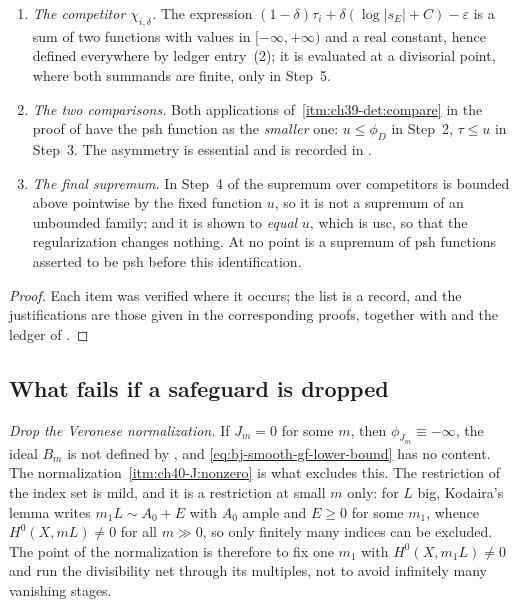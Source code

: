 \begin{proposition}
\begin{enumerate}
 in $[-\infty,+\infty)$ and $h$ is real valued and continuous; the
 inequality $\tau_i\le h+\varepsilon$ is an inequality in
 $[-\infty,+\infty)$.  No difference $\tau_i-h$ is formed at a point
 where $\tau_i=-\infty$.
\item\label{itm:ch40-safe:competitor}
 \emph{The competitor $\chi_{i,\delta}$.}  The expression
 $(1-\delta)\tau_i+\delta(\log|s_E|+C)-\varepsilon$ is a sum of two
 functions with values in $[-\infty,+\infty)$ and a real constant, hence
 defined everywhere by ledger entry~(2); it is evaluated at a divisorial
 point, where both summands are finite, only in Step~5.
\item\label{itm:ch40-safe:comparison}
 \emph{The two comparisons.}  Both applications of
 \,\cref{itm:ch39-det:compare} in the
 proof of  have the psh function as the
 \emph{smaller} one: $u\le\phi_D$ in Step~2, $\tau\le u$ in Step~3.  The
 asymmetry is essential and is recorded in
 .
\item\label{itm:ch40-safe:sup}
 \emph{The final supremum.}  In Step~4 of
  the supremum over competitors is bounded
 above pointwise by the fixed function $u$, so it is not a supremum of an
 unbounded family; and it is shown to \emph{equal} $u$, which is usc, so
 that the regularization changes nothing.  At no point is a supremum of psh
 functions asserted to be psh before this identification.
\end{enumerate}
\end{proposition}

\begin{proof}
Each item was verified where it occurs; the list is a record, and the
justifications are those given in the corresponding proofs, together with
 and the ledger of
.
\end{proof}

\subsection{What fails if a safeguard is dropped}
\label{sec:ch40-safeguard-failures}

\emph{Drop the Veronese normalization.}  If $J_m=0$ for some $m$, then
$\phi_{J_m}\equiv-\infty$, the ideal $B_m$ is not defined by
, and \eqref{eq:bj-smooth-gf-lower-bound} has no
content.  The normalization
\,\cref{itm:ch40-J:nonzero} is what excludes this.
The restriction of the index set is mild, and it is a restriction at small
$m$ only: for $L$ big, Kodaira's lemma writes $m_1L\sim A_0+E$ with
$A_0$ ample and $E\ge0$ for some $m_1$, whence
$H^0(X,mL)\neq0$ for all $m\gg0$, so only finitely many indices can be
excluded.  The point of the normalization is therefore to fix one $m_1$
with $H^0(X,m_1L)\ne0$ and run the divisibility net through its
multiples, not to avoid infinitely many vanishing stages.

